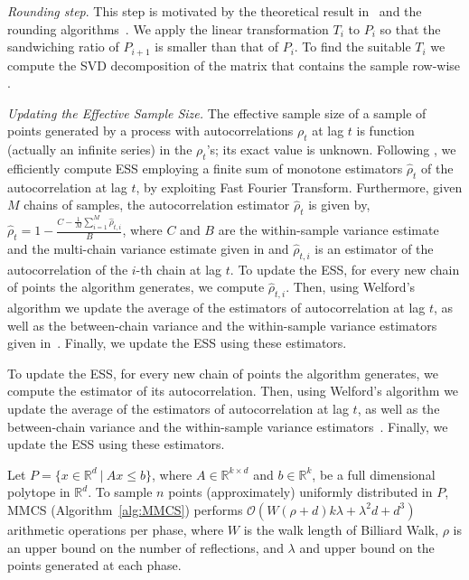   \emph{Rounding step}. 
   This step is motivated by the theoretical result in~\cite{Adamczak10} and the rounding
   algorithms~\cite{Lovasz06, Cousins15}.
   We apply the linear transformation $T_i$ to $P_i$
   so that the sandwiching ratio of $P_{i+1}$ is smaller than that of $P_i$.
   To find the suitable $T_i$ we compute  the SVD decomposition of the matrix that contains the sample row-wise \cite{Shiri20}.
   
   \emph{Updating the  Effective Sample Size.}
   The effective sample size of a sample of points generated by a process with autocorrelations $\rho_t$ at lag $t$
   is function (actually an infinite series) in the $\rho_t$'s; its exact value is unknown.
   Following \cite{geyer92}, we efficiently compute ESS employing a finite sum of monotone estimators
   $\hat{\rho}_t$ of the autocorrelation at lag $t$, by exploiting Fast Fourier Transform. 
   Furthermore, given $M$ chains of samples, the autocorrelation estimator $\hat{\rho}_t$ is given by,
   $\hat{\rho}_t = 1 - \frac{C - \frac{1}{M}\sum_{i=1}^{M}\hat{\rho}_{t,i}}{B}$, 
   where $C$ and $B$ are the within-sample variance estimate and the multi-chain variance estimate given in \cite{Gelman92} and $\hat{\rho}_{t,i}$ is an estimator of the autocorrelation of the $i$-th chain at lag $t$.
   To update the ESS, for every new chain of points the algorithm generates, we compute
   $\hat{\rho}_{t,i}$. Then, using Welford's algorithm we
   update the average of the estimators of autocorrelation at lag $t$,
   as well as the between-chain variance and the within-sample variance estimators given in~\cite{Gelman92}.
   Finally, we update the ESS using these estimators.

   To update the ESS, for every new chain of points the algorithm generates, we compute
   the estimator of its autocorrelation. Then, using Welford's algorithm we
   update the average of the estimators of autocorrelation at lag $t$,
   as well as the between-chain variance and the within-sample variance estimators~\cite{Gelman92}.
   Finally, we update the ESS using these estimators.
   
   
   \begin{lem}
     \label{lem:mmcs_complexity}
     Let $P=\{x\in\mathbb{R}^d\ |\ Ax\leq b\}$, where $A\in\mathbb{R}^{k\times d}$ and
     $b\in\mathbb{R}^k$, be a full dimensional polytope in $\mathbb{R}^d$.
     To sample $n$ points  (approximately) uniformly distributed in $P$,
     MMCS (Algorithm~\ref{alg:MMCS}) performs
     $\mathcal{O}(W(\rho + d)k\lambda + \lambda^2d + d^3)$
     arithmetic operations per phase, where $W$ is the walk length
     of Billiard Walk,
     $\rho$ is an upper bound on the number of reflections, and $\lambda$
     and upper bound on the points generated at each phase.
   \end{lem}
   
